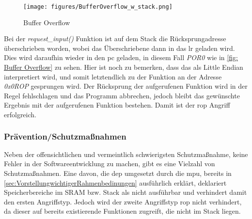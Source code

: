 \documentclass[a4paper,
DIV=13,
12pt,
BCOR=10mm,
department=FakIM,
oneside,
parskip=half,
automark,
listof=totocnumbered,
bibliography=totocnumbered,
acronym=totocnumbered
] {OTHRartcl}
\begin{document}
\begin{figure}[ht!]
  \begin{center}
    \texttt{[image: figures/BufferOverflow\_w\_stack.png]}
    \caption{Buffer Overflow}
    \label{fig: Buffer Overflow}
  \end{center}
\end{figure}
Bei der \textit{request\_input()} Funktion ist auf dem Stack die Rücksprungadresse überschrieben worden, wobei das Überschriebene dann in das \ac{lr} geladen wird.
Dies wird daraufhin wieder in den \ac{pc} geladen, in diesem Fall \textit{POR0} wie in \autoref{fig: Buffer Overflow} zu sehen.
Hier ist noch zu bemerken, dass das als Little Endian interpretiert wird, und somit
letztendlich zu der Funktion an der Adresse \textit{0x0ROP} gesprungen wird.
Der Rücksprung der aufgerufenen Funktion wird in der Regel fehlschlagen und das Programm abbrechen, jedoch bleibt das gewünschte Ergebnis mit der aufgerufenen Funktion bestehen.
Damit ist der \ac{rop} Angriff erfolgreich. \cite{IEEE Xplore ROP} \cite{OWASP Buffer Overflow Attack}

\subsubsection{Prävention/Schutzmaßnahmen}
Neben der offensichtlichen und vermeintlich schwierigsten Schutzmaßnahme, keine Fehler in der Softwareentwicklung zu machen, gibt es eine Vielzahl von Schutzmaßnahmen.
Eine davon, die \ac{dep} umgesetzt durch die \ac{mpu}, bereits in \autoref{sec:VorstellungwichtigerRahmenbedinungen} ausführlich erklärt, deklariert Speicherbereiche im SRAM bzw. Stack als nicht ausführbar
und verhindert damit den ersten Angriffstyp. Jedoch wird der zweite Angriffstyp \ac{rop} nicht verhindert, da dieser auf bereits existierende Funktionen zugreift, die nicht im Stack liegen.
\end{document}
